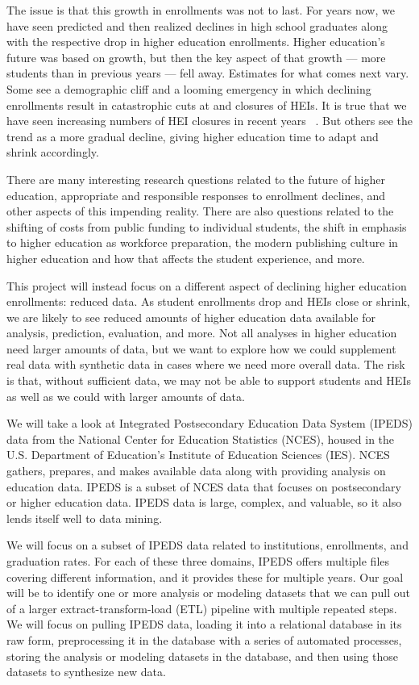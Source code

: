 \documentclass[sigconf, authorversion, nonacm]{acmart}
\begin{document}
    The issue is that this growth in enrollments was not to last. For years now, we have seen predicted and then realized declines in high school graduates along with the respective drop in higher education enrollments. Higher education's future was based on growth, but then the key aspect of that growth --- more students than in previous years --- fell away. Estimates for what comes next vary. Some see a demographic cliff and a looming emergency in which declining enrollments result in catastrophic cuts at and closures of HEIs. It is true that we have seen increasing numbers of HEI closures in recent years ~\cite{hechingercollegeclosures}. But others see the trend as a more gradual decline, giving higher education time to adapt and shrink accordingly. \cite{insidehighereddemographiccliff}

    There are many interesting research questions related to the future of higher education, appropriate and responsible responses to enrollment declines, and other aspects of this impending reality. There are also questions related to the shifting of costs from public funding to individual students, the shift in emphasis to higher education as workforce preparation, the modern publishing culture in higher education and how that affects the student experience, and more.

    This project will instead focus on a different aspect of declining higher education enrollments: reduced data. As student enrollments drop and HEIs close or shrink, we are likely to see reduced amounts of higher education data available for analysis, prediction, evaluation, and more. Not all analyses in higher education need larger amounts of data, but we want to explore how we could supplement real data with synthetic data in cases where we need more overall data. The risk is that, without sufficient data, we may not be able to support students and HEIs as well as we could with larger amounts of data.

    We will take a look at Integrated Postsecondary Education Data System (IPEDS) data from the National Center for Education Statistics (NCES), housed in the U.S. Department of Education's Institute of Education Sciences (IES). NCES gathers, prepares, and makes available data along with providing analysis on education data. IPEDS is a subset of NCES data that focuses on postsecondary or higher education data. IPEDS data is large, complex, and valuable, so it also lends itself well to data mining. \cite{ipeds}

    We will focus on a subset of IPEDS data related to institutions, enrollments, and graduation rates. For each of these three domains, IPEDS offers multiple files covering different information, and it provides these for multiple years. Our goal will be to identify one or more analysis or modeling datasets that we can pull out of a larger extract-transform-load (ETL) pipeline with multiple repeated steps. We will focus on pulling IPEDS data, loading it into a relational database in its raw form, preprocessing it in the database with a series of automated processes, storing the analysis or modeling datasets in the database, and then using those datasets to synthesize new data.
\end{document}

